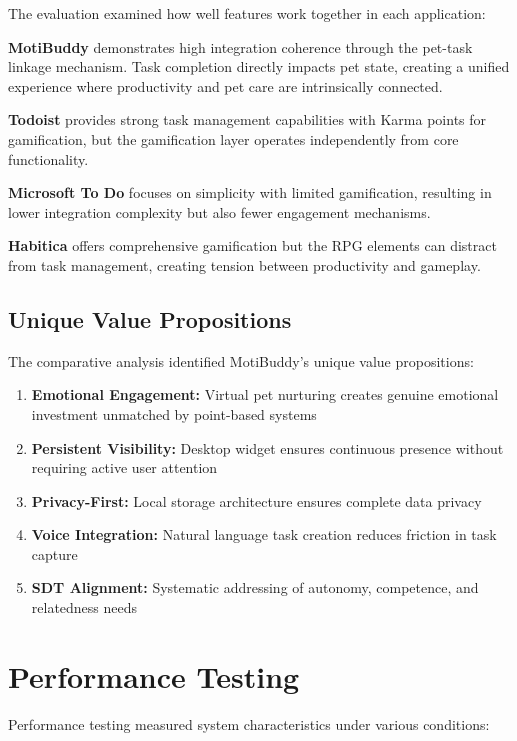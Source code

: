 The evaluation examined how well features work together in each application:

\textbf{MotiBuddy} demonstrates high integration coherence through the pet-task linkage mechanism. Task completion directly impacts pet state, creating a unified experience where productivity and pet care are intrinsically connected.

\textbf{Todoist} provides strong task management capabilities with Karma points for gamification, but the gamification layer operates independently from core functionality.

\textbf{Microsoft To Do} focuses on simplicity with limited gamification, resulting in lower integration complexity but also fewer engagement mechanisms.

\textbf{Habitica} offers comprehensive gamification but the RPG elements can distract from task management, creating tension between productivity and gameplay.

\subsection{Unique Value Propositions}

The comparative analysis identified MotiBuddy's unique value propositions:

\begin{enumerate}
    \item \textbf{Emotional Engagement:} Virtual pet nurturing creates genuine emotional investment unmatched by point-based systems
    \item \textbf{Persistent Visibility:} Desktop widget ensures continuous presence without requiring active user attention
    \item \textbf{Privacy-First:} Local storage architecture ensures complete data privacy
    \item \textbf{Voice Integration:} Natural language task creation reduces friction in task capture
    \item \textbf{SDT Alignment:} Systematic addressing of autonomy, competence, and relatedness needs
\end{enumerate}

\section{Performance Testing}
\label{sec:performance-testing}

\completed

Performance testing measured system characteristics under various conditions:

